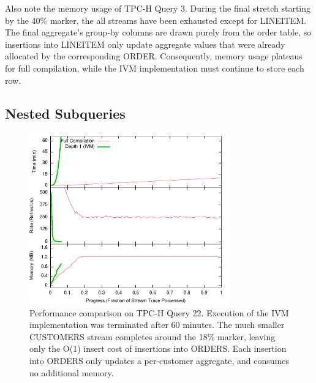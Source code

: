 Also note the memory usage of TPC-H Query 3.  During the final stretch starting by the 40\% marker, the all streams have been exhausted except for LINEITEM.  The final aggregate's group-by columns are drawn purely from the order table, so insertions into LINEITEM only update aggregate values that were already  allocated by the corresponding ORDER.  Consequently, memory usage plateaus for full compilation, while the IVM implementation must continue to store each row.

\subsection{Nested Subqueries}

\begin{figure}
\begin{center}
\includegraphics[width=3.4in]{../graphs/graphs/unified_tpch22.pdf}
\caption{Performance comparison on TPC-H Query 22.  Execution of the IVM implementation was terminated after 60 minutes.  The much smaller CUSTOMERS stream completes around the 18\% marker, leaving only the O(1) insert cost of insertions into ORDERS.  Each insertion into ORDERS only updates a per-customer aggregate, and consumes no additional memory.}
\label{fig:experiments:tpch22}
\end{center}
\end{figure}

